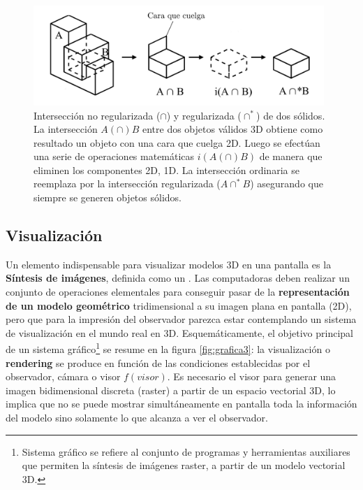 \begin{figure}[ht]
\includegraphics[width=11cm]{Img/GEO/geo-booleano2.png}
\centering
\caption{\footnotesize{Intersección no regularizada ($\cap$) y regularizada ($\cap^*$) de dos sólidos. La intersección $A (\cap) B$ entre dos objetos válidos 3D obtiene como resultado un objeto con una cara que cuelga 2D. Luego se efectúan una serie de operaciones matemáticas $i(A (\cap) B)$ de manera que eliminen los componentes 2D, 1D. La intersección ordinaria se reemplaza por la intersección regularizada ($ A \cap^* B$) \citep{Torres2014} asegurando que siempre se generen objetos sólidos.}}
\label{solucion-solido}
\end{figure}


\subsection{Visualización}
\label{visGeo}

Un elemento indispensable para visualizar modelos 3D en una pantalla es la \textbf{Síntesis de imágenes}, definida como un  \citet{Ramos2011}. 
Las computadoras deben realizar un conjunto de operaciones elementales  para conseguir pasar de la \textbf{representación de un modelo geométrico} tridimensional a su imagen plana en pantalla (2D), pero que para la impresión del observador parezca estar contemplando un sistema de visualización en el mundo real en 3D. 
Esquemáticamente, el objetivo principal de un sistema gráfico\footnote{Sistema gráfico se refiere al conjunto de programas y herramientas auxiliares que permiten la síntesis de imágenes raster, a partir de un modelo vectorial 3D.} se resume en la figura \ref{fig:grafica3}: la visualización o \textbf{rendering} se produce en función de las condiciones establecidas por el observador, cámara o visor $f(visor)$. Es necesario el visor para generar una imagen bidimensional discreta (raster) a partir de un espacio vectorial 3D, lo implica que no se puede mostrar simultáneamente en  pantalla toda la información del modelo sino solamente lo que alcanza a ver el observador.\newline


